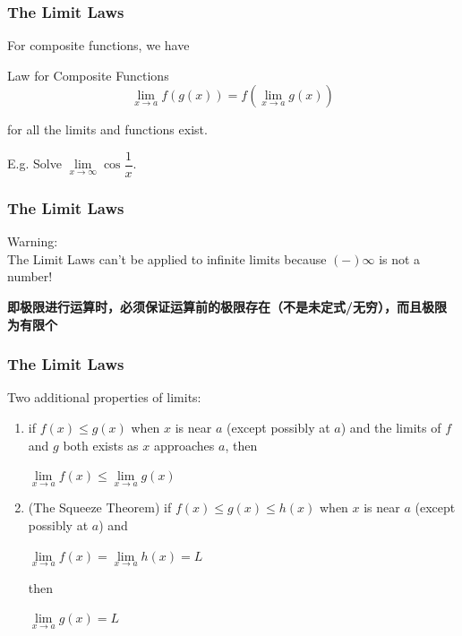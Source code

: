 \begin{frame}
	\frametitle{The Limit Laws}
	For composite functions, we have
	\begin{block}{Law for Composite Functions}
		\[\lim\limits_{\textit{x} \to a}f(g(x)) = f(\lim\limits_{\textit{x} \to a}g(x))\]

		for all the limits and functions exist.

	\end{block}

	E.g. Solve $\lim\limits_{\textit{x} \to \infty} \cos\dfrac{1}{x}$.
\end{frame}
\begin{frame}
	\frametitle{The Limit Laws}
	\alert{Warning:}\\
	The Limit Laws can't be applied to infinite limits because $(-)\infty$ is not a number!

	\textbf{即极限进行运算时，必须保证运算前的极限存在（不是未定式/无穷），而且极限为有限个}
\end{frame}
\begin{frame}
	\frametitle{The Limit Laws}
	Two additional properties of limits:
	\begin{enumerate}
		\item if $f(x) \leq g(x)$ when $x$ is near $a$ (\alert{except possibly} at $a$) and the limits of $f$ and $g$ both exists as $x$ approaches $a$, then
		      \begin{center}
			      $\lim\limits_{\textit{x} \to a}f(x) \leq \lim\limits_{\textit{x} \to a}g(x)$
		      \end{center}
		\item \alert{(The Squeeze Theorem)} if $f(x) \leq g(x) \leq h(x)$ when $x$ is near $a$ (\alert{except possibly} at $a$) and
		      \begin{center}
			      $\lim\limits_{\textit{x} \to a}f(x) = \lim\limits_{\textit{x} \to a}h(x) = L$
		      \end{center}
		      then
		      \begin{center}
			      $\lim\limits_{\textit{x} \to a}g(x) = L$
		      \end{center}
	\end{enumerate}
\end{frame}

